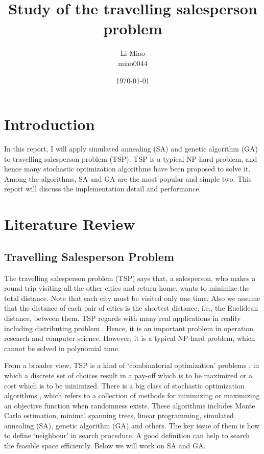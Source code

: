 \documentclass[a4paper,12pt]{article}
\author{Li Miao\\miao0044}
\title{Study of the travelling salesperson problem}
\date{\today}
\begin{document}
\onehalfspacing
\maketitle

\section{Introduction}

	 In this report, I will apply simulated annealing (SA) and genetic algorithm (GA) to travelling salesperson problem (TSP). TSP is a typical NP-hard problem, and hence many stochastic optimization algorithms have been proposed to solve it. Among the algorithms, SA and GA are the most popular and simple two. This report will discuss the implementation detail and performance.

\section{Literature Review}

	\subsection{Travelling Salesperson Problem}
	The travelling salesperson problem (TSP) says that, a salesperson, who makes a round trip visiting all the other cities  and return home, wants to minimize the total distance. Note that each city must be visited only one time. Also we assume that the distance of each pair of cities is the shortest distance, i.e., the Euclidean distance, between them. TSP regards with many real applications in reality including distributing problem \cite{ref1}. Hence, it is an important problem in operation research and computer science. However, it is a typical NP-hard problem, which cannot be solved in polynomial time.

	 From a broader view, TSP is a kind of `combinatorial optimization' problems \cite{ref2}, in which a discrete set of choices result in a pay-off which is to be maximized or a cost which is to be minimized.  There is a big class of  stochastic optimization algorithms \cite{ref3},  which refers to a collection of methods for minimizing or maximizing an objective function when randomness exists. These algorithms includes Monte Carlo estimation, minimal spanning trees, linear programming, simulated annealing (SA), genetic algorithm (GA)  and others. The key issue of them is how to define `neighbour' in search procedure. A good definition can help to search the feasible space efficiently. Below we will work on SA and GA.
\end{document}
